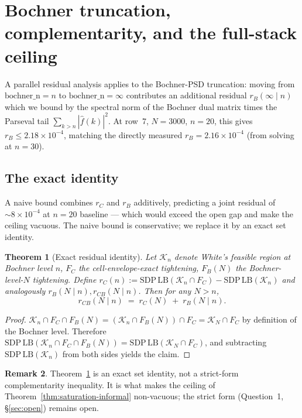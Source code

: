 \documentclass[11pt]{article}
\theoremstyle{plain}
\newtheorem{theorem}{Theorem}
\theoremstyle{definition}
\newtheorem{remark}[theorem]{Remark}
\begin{document}
\section{Bochner truncation, complementarity, and the full-stack ceiling}\label{sec:saturation}

A parallel residual analysis applies to the Bochner-PSD truncation:
moving from $\mathrm{bochner\_n} = n$ to $\mathrm{bochner\_n} = \infty$
contributes an additional residual $r_B(\infty \mid n)$ which we bound
by the spectral norm of the Bochner dual matrix times the Parseval tail
$\sum_{k > n} |\hat f(k)|^2$. At row~7, $N = 3000$, $n = 20$, this gives
$r_B \le 2.18 \times 10^{-4}$, matching the directly measured
$r_B = 2.16 \times 10^{-4}$ (from solving at $n = 30$).

\subsection{The exact identity}

A naive bound combines $r_C$ and $r_B$ additively, predicting a
joint residual of $\sim 8 \times 10^{-4}$ at $n = 20$ baseline --- which
would exceed the open gap and make the ceiling vacuous. The naive bound
is conservative; we replace it by an exact set identity.

\begin{theorem}[Exact residual identity]\label{thm:tautological}
Let $\mathcal{K}_n$ denote White's feasible region at Bochner level
$n$, $F_C$ the cell-envelope-exact tightening, $F_B(N)$ the
Bochner-level-$N$ tightening. Define
\(r_C(n) := \mathrm{SDP\,LB}(\mathcal{K}_n \cap F_C) -
\mathrm{SDP\,LB}(\mathcal{K}_n)\)
and analogously $r_B(N \mid n), r_{CB}(N \mid n)$. Then for any
$N > n$,
\[
r_{CB}(N \mid n) \;=\; r_C(N) \;+\; r_B(N \mid n).
\]
\end{theorem}

\begin{proof}
$\mathcal{K}_n \cap F_C \cap F_B(N) =
(\mathcal{K}_n \cap F_B(N)) \cap F_C = \mathcal{K}_N \cap F_C$ by
definition of the Bochner level. Therefore
$\mathrm{SDP\,LB}(\mathcal{K}_n \cap F_C \cap F_B(N))
= \mathrm{SDP\,LB}(\mathcal{K}_N \cap F_C)$, and subtracting
$\mathrm{SDP\,LB}(\mathcal{K}_n)$ from both sides yields the claim.
\end{proof}

\begin{remark}
Theorem~\ref{thm:tautological} is an exact set identity, not a
strict-form complementarity inequality. It is what makes the ceiling
of Theorem~\ref{thm:saturation-informal} non-vacuous; the strict form
(Question~1, \S\ref{sec:open}) remains open.
\end{remark}
\end{document}
